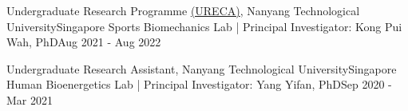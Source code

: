 \documentclass[../main.tex]{subfiles}
\begin{document}

    \resumeSubheading %
      {Undergraduate Research Programme  \href{https://www.ntu.edu.sg/education/undergraduate-research-experience-on-campus-(ureca)}{(URECA)}, Nanyang Technological University}{Singapore}
      {Sports Biomechanics Lab | Principal Investigator: Kong Pui Wah, PhD}{Aug 2021 - Aug 2022}

    \resumeSubheading %
      {Undergraduate Research Assistant, Nanyang Technological University}{Singapore}
      {Human Bioenergetics Lab | Principal Investigator: Yang Yifan, PhD}{Sep 2020 - Mar 2021}
        
    
  \resumeSubHeadingListEnd
\end{document}
